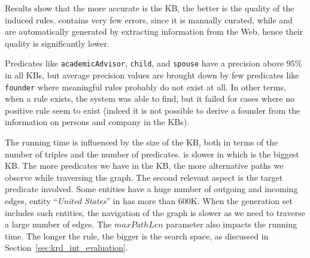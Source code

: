 Results show that the more accurate is the KB, the better is the quality of the induced rules. \wikidata contains very few errors, since it is manually curated, while
 \dbpedia and \yago are automatically generated by extracting information from the Web, hence their quality is significantly lower. 

Predicates like \texttt{academicAdvisor}, \texttt{child}, and \texttt{spouse} have a precision above $95\%$ in all KBs, but average precision values are brought down by few predicates like \texttt{founder} where meaningful rules probably do not exist at all. In other terms, when a rule exists, the system was able to find, but it failed for cases where no positive rule seem to exist (indeed it is not possible to derive a founder from the information on persons and company in the KBs). 

The running time is influenced by the size of the KB, both in terms of the number of triples and the number of predicates. \krd is slower in \wikidata which is the biggest KB. The more predicates we have in the KB, the more alternative paths we observe while traversing the graph.
The second relevant aspect is the target predicate involved. Some entities have a huge number of outgoing and incoming edges, entity ``\textit{United States}'' in \wikidata has more than $600$K. When the generation set includes such entities, the navigation of the graph is slower as we need to traverse a large number of edges. 
The $maxPathLen$ parameter also impacts the running time. The longer the rule, the bigger is the search space, as discussed in Section~\ref{sec:krd_int_evaluation}. 

